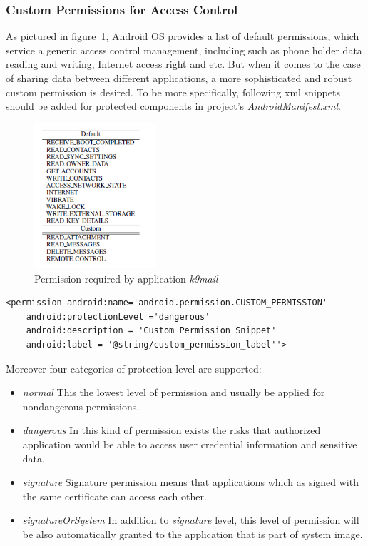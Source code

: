 \subsubsection{Custom Permissions for Access Control}
As pictured in figure~\ref{fig:android-permission2}, Android OS provides a list of default permissions, which service a generic access control management, including such as  phone  holder data reading and writing, Internet access right and etc. But when it comes to the case of sharing data between different applications, a more sophisticated and robust custom permission is desired. To be more specifically, following xml snippets should be added for protected components in project's \emph{AndroidManifest.xml}\cite{android_secure_cook}.
\begin{figure}[!htbp]
	\centering
	\includegraphics[width=0.4\textwidth]{android-permission2.jpg}
		\caption{Permission required by application \emph{k9mail}\cite{android_secure_design}}
	\label{fig:android-permission2}
\end{figure}
\begin{Verbatim}[fontsize=\relsize{-1},frame=lines,framesep=4mm, label=\fbox{\small\emph{'Custom Permission Snippet}}]
<permission android:name='android.permission.CUSTOM_PERMISSION'
	android:protectionLevel ='dangerous'
	android:description = 'Custom Permission Snippet'
	android:label = '@string/custom_permission_label''>
\end{Verbatim} 
Moreover four categories of protection level are supported\cite{android_secure_cook}:
\begin{itemize}
\item \emph{normal} This the lowest level of permission and usually be applied for nondangerous permissions. 
\item \emph{dangerous}  In this kind of permission exists the risks that authorized application would be able to access user credential information and sensitive data.
\item \emph{signature} Signature permission means that applications  which as signed with the same certificate can access each other.
\item \emph{signatureOrSystem} In addition to \emph{signature} level, this level of permission will be also automatically granted to the application that is part of system image.
\end{itemize}
